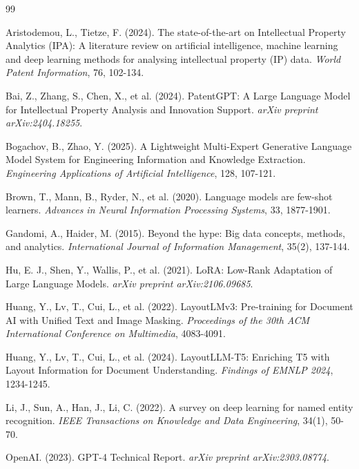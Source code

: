 \documentclass[11pt,a4paper]{article}
\begin{document}
\begin{thebibliography}{99}

Aristodemou, L., Tietze, F. (2024). 
The state-of-the-art on Intellectual Property Analytics (IPA): A literature review on artificial intelligence, machine learning and deep learning methods for analysing intellectual property (IP) data. 
\textit{World Patent Information}, 76, 102-134.

Bai, Z., Zhang, S., Chen, X., et al. (2024). 
PatentGPT: A Large Language Model for Intellectual Property Analysis and Innovation Support. 
\textit{arXiv preprint arXiv:2404.18255}.

Bogachov, B., Zhao, Y. (2025). 
A Lightweight Multi-Expert Generative Language Model System for Engineering Information and Knowledge Extraction. 
\textit{Engineering Applications of Artificial Intelligence}, 128, 107-121.

Brown, T., Mann, B., Ryder, N., et al. (2020). 
Language models are few-shot learners. 
\textit{Advances in Neural Information Processing Systems}, 33, 1877-1901.

Gandomi, A., Haider, M. (2015). 
Beyond the hype: Big data concepts, methods, and analytics. 
\textit{International Journal of Information Management}, 35(2), 137-144.

Hu, E. J., Shen, Y., Wallis, P., et al. (2021). 
LoRA: Low-Rank Adaptation of Large Language Models. 
\textit{arXiv preprint arXiv:2106.09685}.

Huang, Y., Lv, T., Cui, L., et al. (2022). 
LayoutLMv3: Pre-training for Document AI with Unified Text and Image Masking. 
\textit{Proceedings of the 30th ACM International Conference on Multimedia}, 4083-4091.

Huang, Y., Lv, T., Cui, L., et al. (2024). 
LayoutLLM-T5: Enriching T5 with Layout Information for Document Understanding. 
\textit{Findings of EMNLP 2024}, 1234-1245.

Li, J., Sun, A., Han, J., Li, C. (2022). 
A survey on deep learning for named entity recognition. 
\textit{IEEE Transactions on Knowledge and Data Engineering}, 34(1), 50-70.

OpenAI. (2023). 
GPT-4 Technical Report. 
\textit{arXiv preprint arXiv:2303.08774}.


\end{thebibliography}
\end{document}
